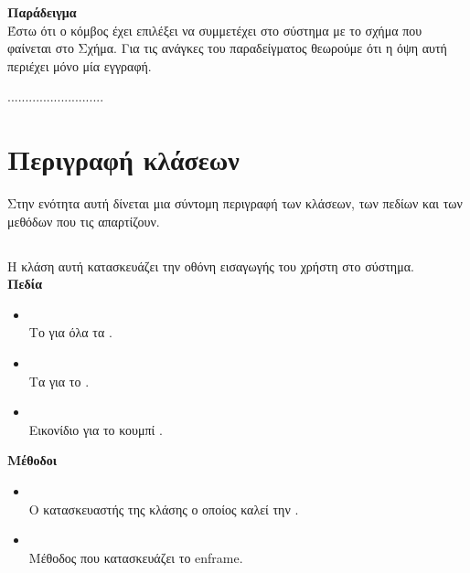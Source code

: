 \noindent\textbf{Παράδειγμα} \\

Έστω ότι ο κόμβος έχει επιλέξει να συμμετέχει στο σύστημα με το  σχήμα που φαίνεται
στο Σχήμα.  Για τις ανάγκες του παραδείγματος θεωρούμε
ότι η όψη αυτή περιέχει μόνο μία εγγραφή.

...........................

\section{Περιγραφή κλάσεων}
Στην ενότητα αυτή δίνεται μια σύντομη περιγραφή των κλάσεων,
των πεδίων και των μεθόδων που τις απαρτίζουν.

\subsection{}
\noindent Η κλάση αυτή κατασκευάζει την οθόνη εισαγωγής του χρήστη στο σύστημα.\\

\noindent\textbf{Πεδία}

\begin{itemize}
\item{} \\
Το  για όλα τα .
\item{} \\
Τα  για το .
\item{} \\
Εικονίδιο για το κουμπί .
\end{itemize}

\noindent\textbf{Μέθοδοι}

\begin{itemize}
\item{}\\
Ο κατασκευαστής της κλάσης ο οποίος καλεί την .
\item{}\\
Μέθοδος που κατασκευάζει το en{frame}.
\end{itemize}